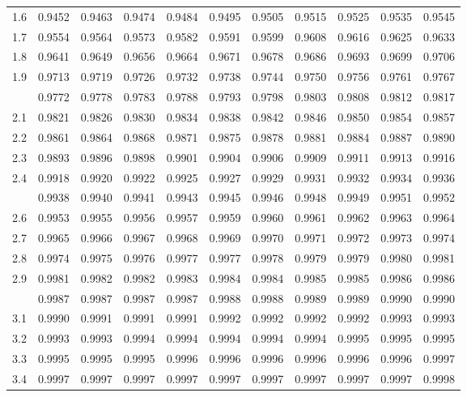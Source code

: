 \documentclass[12pt,a4paper]{article}
\begin{document}
\begin{enumerate}
\begin{center}
\begin{longtable}{ccccccccccc}
1.6 & 0.9452 & 0.9463 & 0.9474 & 0.9484 & 0.9495 & 0.9505 & 0.9515 & 0.9525 & 0.9535 & 0.9545 \\
1.7 & 0.9554 & 0.9564 & 0.9573 & 0.9582 & 0.9591 & 0.9599 & 0.9608 & 0.9616 & 0.9625 & 0.9633 \\
1.8 & 0.9641 & 0.9649 & 0.9656 & 0.9664 & 0.9671 & 0.9678 & 0.9686 & 0.9693 & 0.9699 & 0.9706 \\
1.9 & 0.9713 & 0.9719 & 0.9726 & 0.9732 & 0.9738 & 0.9744 & 0.9750 & 0.9756 & 0.9761 & 0.9767 \\
\addlinespace
2.0 & 0.9772 & 0.9778 & 0.9783 & 0.9788 & 0.9793 & 0.9798 & 0.9803 & 0.9808 & 0.9812 & 0.9817 \\
2.1 & 0.9821 & 0.9826 & 0.9830 & 0.9834 & 0.9838 & 0.9842 & 0.9846 & 0.9850 & 0.9854 & 0.9857 \\
2.2 & 0.9861 & 0.9864 & 0.9868 & 0.9871 & 0.9875 & 0.9878 & 0.9881 & 0.9884 & 0.9887 & 0.9890 \\
2.3 & 0.9893 & 0.9896 & 0.9898 & 0.9901 & 0.9904 & 0.9906 & 0.9909 & 0.9911 & 0.9913 & 0.9916 \\
2.4 & 0.9918 & 0.9920 & 0.9922 & 0.9925 & 0.9927 & 0.9929 & 0.9931 & 0.9932 & 0.9934 & 0.9936 \\
\addlinespace
2.5 & 0.9938 & 0.9940 & 0.9941 & 0.9943 & 0.9945 & 0.9946 & 0.9948 & 0.9949 & 0.9951 & 0.9952 \\
2.6 & 0.9953 & 0.9955 & 0.9956 & 0.9957 & 0.9959 & 0.9960 & 0.9961 & 0.9962 & 0.9963 & 0.9964 \\
2.7 & 0.9965 & 0.9966 & 0.9967 & 0.9968 & 0.9969 & 0.9970 & 0.9971 & 0.9972 & 0.9973 & 0.9974 \\
2.8 & 0.9974 & 0.9975 & 0.9976 & 0.9977 & 0.9977 & 0.9978 & 0.9979 & 0.9979 & 0.9980 & 0.9981 \\
2.9 & 0.9981 & 0.9982 & 0.9982 & 0.9983 & 0.9984 & 0.9984 & 0.9985 & 0.9985 & 0.9986 & 0.9986 \\
\addlinespace
3.0 & 0.9987 & 0.9987 & 0.9987 & 0.9987 & 0.9988 & 0.9988 & 0.9989 & 0.9989 & 0.9990 & 0.9990 \\
3.1 & 0.9990 & 0.9991 & 0.9991 & 0.9991 & 0.9992 & 0.9992 & 0.9992 & 0.9992 & 0.9993 & 0.9993 \\
3.2 & 0.9993 & 0.9993 & 0.9994 & 0.9994 & 0.9994 & 0.9994 & 0.9994 & 0.9995 & 0.9995 & 0.9995 \\
3.3 & 0.9995 & 0.9995 & 0.9995 & 0.9996 & 0.9996 & 0.9996 & 0.9996 & 0.9996 & 0.9996 & 0.9997 \\
3.4 & 0.9997 & 0.9997 & 0.9997 & 0.9997 & 0.9997 & 0.9997 & 0.9997 & 0.9997 & 0.9997 & 0.9998 \\
\end{longtable}
\end{center}



\end{enumerate}
\end{document}
